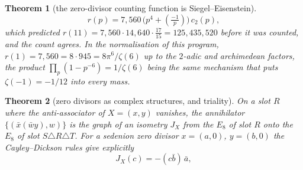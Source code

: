 \documentclass[11pt]{amsart}
\newtheorem{theorem}{Theorem}[section]
\theoremstyle{definition}
\begin{document}
\begin{theorem}[the zero-divisor counting function is Siegel--Eisenstein]
\[r(p)=7{,}560\,\big(p^4+(\tfrac{-1}{p})\big)\,c_2(p),\]
which predicted $r(11)=7{,}560\cdot14{,}640\cdot\tfrac{17}{15}=125{,}435{,}520$ before it was counted, and the count agrees. In the normalisation of this program, $r(1)=7{,}560=8\cdot945=8\pi^6/\zeta(6)$ up to the $2$-adic and archimedean factors, the product $\prod_p(1-p^{-6})=1/\zeta(6)$ being the same mechanism that puts $\zeta(-1)=-1/12$ into every mass.
\end{theorem}
\begin{theorem}[zero divisors as complex structures, and triality]\label{thm:complex}
On a slot $R$ where the anti-associator of $X=(x,y)$ vanishes, the annihilator $\{(\bar x(\bar wy),w)\}$ is the graph of an isometry $J_X$ from the $E_8$ of slot $R$ onto the $E_8$ of slot $S\triangle R\triangle T$. For a sedenion zero divisor $x=(a,0)$, $y=(b,0)$ the Cayley--Dickson rules give explicitly
\[J_X(c)=-(c\bar b)\,\bar a,\]

\end{theorem}
\end{document}

